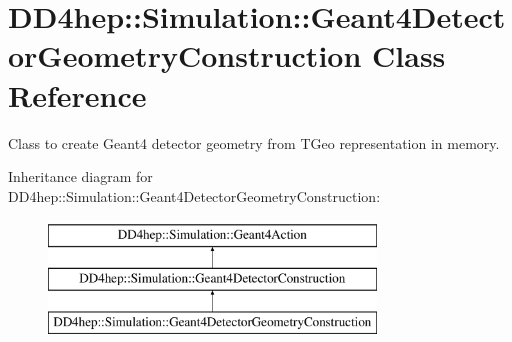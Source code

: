 \hypertarget{class_d_d4hep_1_1_simulation_1_1_geant4_detector_geometry_construction}{}\section{D\+D4hep\+:\+:Simulation\+:\+:Geant4\+Detector\+Geometry\+Construction Class Reference}
\label{class_d_d4hep_1_1_simulation_1_1_geant4_detector_geometry_construction}


Class to create Geant4 detector geometry from T\+Geo representation in memory.  


Inheritance diagram for D\+D4hep\+:\+:Simulation\+:\+:Geant4\+Detector\+Geometry\+Construction\+:\begin{figure}[H]
\begin{center}
\leavevmode
\includegraphics[height=3.000000cm]{class_d_d4hep_1_1_simulation_1_1_geant4_detector_geometry_construction}
\end{center}
\end{figure}

